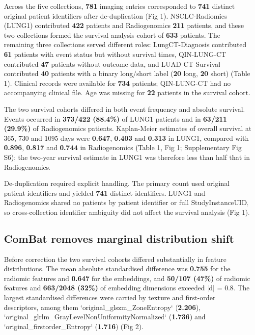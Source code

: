 \documentclass[a4paper,fleqn]{cas-sc}
\begin{document}
Across the five collections, \textbf{781} imaging entries corresponded to \textbf{741} distinct original patient identifiers after de-duplication (Fig 1). NSCLC-Radiomics (LUNG1) contributed \textbf{422} patients and Radiogenomics \textbf{211} patients, and these two collections formed the survival analysis cohort of \textbf{633} patients. The remaining three collections served different roles: LungCT-Diagnosis contributed \textbf{61} patients with event status but without survival times, QIN-LUNG-CT contributed \textbf{47} patients without outcome data, and LUAD-CT-Survival contributed \textbf{40} patients with a binary long/short label (\textbf{20} long, \textbf{20} short) (Table 1). Clinical records were available for \textbf{734} patients; QIN-LUNG-CT had no accompanying clinical file. Age was missing for \textbf{22} patients in the survival cohort.

The two survival cohorts differed in both event frequency and absolute survival. Events occurred in \textbf{373/422 (88.4\%)} of LUNG1 patients and in \textbf{63/211 (29.9\%)} of Radiogenomics patients. Kaplan-Meier estimates of overall survival at 365, 730 and 1095 days were \textbf{0.647}, \textbf{0.403} and \textbf{0.313} in LUNG1, compared with \textbf{0.896}, \textbf{0.817} and \textbf{0.744} in Radiogenomics (Table 1, Fig 1; Supplementary Fig S6); the two-year survival estimate in LUNG1 was therefore less than half that in Radiogenomics.

De-duplication required explicit handling. The primary count used original patient identifiers and yielded \textbf{741} distinct identifiers. LUNG1 and Radiogenomics shared no patients by patient identifier or full StudyInstanceUID, so cross-collection identifier ambiguity did not affect the survival analysis (Fig 1).

\subsection{ComBat removes marginal distribution shift}

Before correction the two survival cohorts differed substantially in feature distributions. The mean absolute standardised difference was \textbf{0.755} for the radiomic features and \textbf{0.647} for the embeddings, and \textbf{50/107 (47\%)} of radiomic features and \textbf{663/2048 (32\%)} of embedding dimensions exceeded |d| = 0.8. The largest standardised differences were carried by texture and first-order descriptors, among them `original\_glszm\_ZoneEntropy` (\textbf{2.206}), `original\_glrlm\_GrayLevelNonUniformityNormalized` (\textbf{1.736}) and `original\_firstorder\_Entropy` (\textbf{1.716}) (Fig 2).
\end{document}
